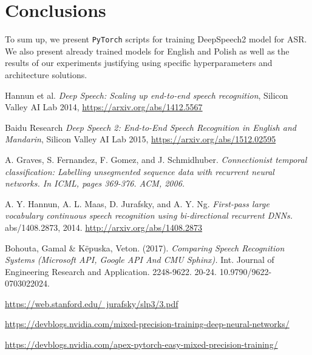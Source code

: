 \documentclass[licencjacka,en]{pracamgr}
\begin{document}
\chapter{Conclusions}\label{r:concls}

To sum up, we present \texttt{PyTorch} scripts for training DeepSpeech2 model for ASR. We also present already trained models for English and Polish as well as the results of our experiments justifying using specific hyperparameters and architecture solutions.

\begin{thebibliography}{99}

 Hannun et al.
\textit{Deep Speech: Scaling up end-to-end speech recognition}, Silicon Valley AI Lab 2014, \href{https://arxiv.org/abs/1412.5567}{https://arxiv.org/abs/1412.5567}

 Baidu Research \textit{Deep Speech 2: End-to-End Speech Recognition in English and Mandarin}, Silicon Valley AI Lab 2015, \href{https://arxiv.org/abs/1512.02595}{https://arxiv.org/abs/1512.02595}

 A. Graves, S. Fernandez, F. Gomez, and J. Schmidhuber. \textit{Connectionist temporal classification:
Labelling unsegmented sequence data with recurrent neural networks. In ICML, pages 369-376. ACM, 2006.}

 A. Y. Hannun, A. L. Maas, D. Jurafsky, and A. Y. Ng. \textit{First-pass large vocabulary continuous speech recognition using bi-directional recurrent DNNs.} abs/1408.2873, 2014. \href{http://arxiv.org/abs/1408.2873}{http://arxiv.org/abs/1408.2873}

 Bohouta, Gamal \& Këpuska, Veton. (2017). \textit{Comparing Speech Recognition Systems (Microsoft API, Google API And CMU Sphinx).} Int. Journal of Engineering Research and Application. 2248-9622. 20-24. 10.9790/9622-0703022024.

 \href{https://web.stanford.edu/~jurafsky/slp3/3.pdf}{https://web.stanford.edu/~jurafsky/slp3/3.pdf}

 \href{https://devblogs.nvidia.com/mixed-precision-training-deep-neural-networks/}
{https://devblogs.nvidia.com/mixed-precision-training-deep-neural-networks/}

 \href{https://devblogs.nvidia.com/apex-pytorch-easy-mixed-precision-training/}{https://devblogs.nvidia.com/apex-pytorch-easy-mixed-precision-training/}


\end{thebibliography}
\end{document}
